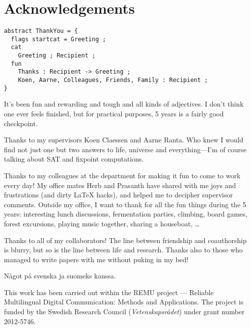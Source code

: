 \chapter*{Acknowledgements}\label{chp:acknowledgements}


\begin{verbatim}
abstract ThankYou = {
  flags startcat = Greeting ;
  cat 
    Greeting ; Recipient ;
  fun
    Thanks : Recipient -> Greeting ;
    Koen, Aarne, Colleagues, Friends, Family : Recipient ;
}
\end{verbatim}


It's been fun and rewarding and tough and all kinds of
adjectives. %
I don't think one ever feels finished, but for practical purposes, 5
years is a fairly good checkpoint.

Thanks to my supervisors Koen Claessen and Aarne Ranta. Who knew I
would find not just one but two answers to life, universe and
everything---I'm of course talking about SAT and fixpoint
computations.

Thanks to my colleagues at the department for making it fun to come to
work every day! My office mates Herb and Prasanth have shared with me
joys and frustrations (and dirty \LaTeX{} hacks), and helped me to
decipher supervisor comments. Outside my office, I want to thank
 for all the fun things during the 5 years:
interesting lunch discussions, fermentation parties,
climbing, board games, forest excursions, playing music together,
sharing a houseboat, \dots

Thanks to all of my collaborators! The line between friendship and
coauthorship is blurry, but so is the line between life and
research. Thanks also to those who managed to write papers with me
without puking in my bed!

Något på svenska ja suomeks kanssa.

\vfill\noindent
This work has been carried out within the REMU project — Reliable Multilingual Digital Communication: Methods and Applications.
The project is funded by the Swedish Research Council (\emph{Vetenskapsrådet}) under grant number 2012-5746.
